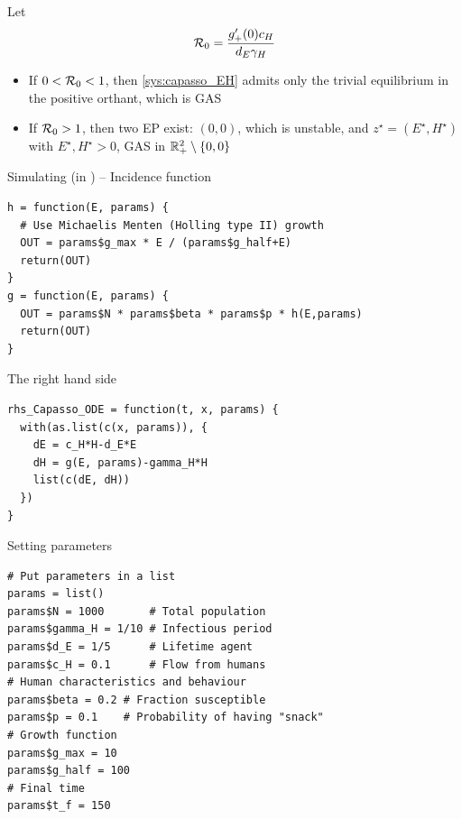 \documentclass[aspectratio=169]{beamer}
\begin{document}
\begin{frame}
  Let
  \begin{equation}
    \label{eq:R0_capasso}
    \mathcal{R}_0 = \frac{g'_+(0)c_H}{d_E\gamma_H}
  \end{equation}
  \begin{theorem}
    \begin{itemize}
      \item If $0<\mathcal{R}_0<1$, then \eqref{sys:capasso_EH} admits only the trivial equilibrium in the positive orthant, which is GAS
      \item If $\mathcal{R}_0>1$, then two EP exist: $(0,0)$, which is unstable, and $z^\star=(E^\star,H^\star)$ with $E^\star,H^\star>0$, GAS in $\mathbb{R}_+^2\setminus\{0,0\}$
    \end{itemize}
  \end{theorem}
\end{frame}

\begin{frame}[fragile]{Simulating (in ) -- Incidence function}
\begin{lstlisting}
h = function(E, params) {
  # Use Michaelis Menten (Holling type II) growth
  OUT = params$g_max * E / (params$g_half+E)
  return(OUT)
}
g = function(E, params) {
  OUT = params$N * params$beta * params$p * h(E,params)
  return(OUT)
}
\end{lstlisting}
\end{frame}

\begin{frame}[fragile]{The right hand side}
\begin{lstlisting}
rhs_Capasso_ODE = function(t, x, params) {
  with(as.list(c(x, params)), {
    dE = c_H*H-d_E*E
    dH = g(E, params)-gamma_H*H
    list(c(dE, dH))
  })
}  
\end{lstlisting}
\end{frame}

\begin{frame}[fragile]{Setting parameters}
\begin{lstlisting}
# Put parameters in a list
params = list()
params$N = 1000       # Total population
params$gamma_H = 1/10 # Infectious period
params$d_E = 1/5      # Lifetime agent
params$c_H = 0.1      # Flow from humans
# Human characteristics and behaviour
params$beta = 0.2 # Fraction susceptible
params$p = 0.1    # Probability of having "snack"
# Growth function
params$g_max = 10
params$g_half = 100
# Final time
params$t_f = 150  
\end{lstlisting}
\end{frame}
\end{document}
